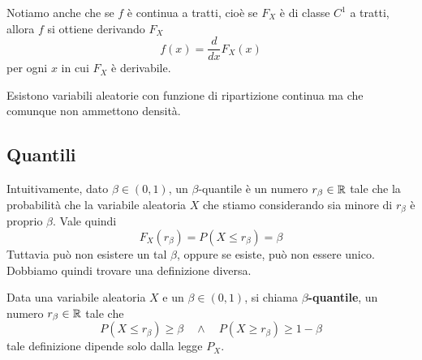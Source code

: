 \begin{center}
\end{center}

\begin{observation}
	Notiamo anche che se $f$ è continua a tratti, cioè
	se $F_X$ è di classe $C^1$ a tratti, allora $f$ si ottiene derivando $F_X$
	\[ f(x) = \frac{d}{dx} F_X (x) \]
	per ogni $x$ in cui $F_X$ è derivabile.
\end{observation}

\begin{observation}
	Esistono variabili aleatorie con funzione di ripartizione continua ma che comunque non
	ammettono densità.
\end{observation}

\subsection{Quantili}
Intuitivamente, dato $\beta \in (0,1)$, un $\beta$-quantile è un numero $r_\beta \in \mathbb{R}$ tale che
la probabilità che la variabile aleatoria $X$ che stiamo considerando sia minore di $r_\beta$ è
proprio $\beta$. Vale quindi
\[ F_X (r_\beta) = P(X \leq r_\beta) = \beta \]
Tuttavia può non esistere un tal $\beta$, oppure se esiste, può non essere unico. Dobbiamo quindi
trovare una definizione diversa.

\begin{definition}\label{def: quantile}
	Data una variabile aleatoria $X$ e un $\beta \in (0,1)$, si chiama $\beta$\textbf{-quantile},
	un numero $r_\beta \in \mathbb{R}$ tale che
	\[ P(X \leq r_\beta) \geq \beta \quad \land \quad P(X \geq r_\beta) \geq 1 - \beta \]
	tale definizione dipende solo dalla legge $P_X$.
\end{definition}

